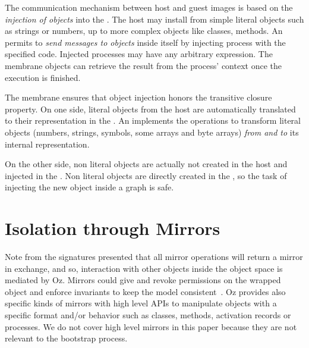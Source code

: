 The communication mechanism between host and guest images is based on the \emph{injection of objects} into the \objectspace. The host may install from simple literal objects such as strings or numbers, up to more complex objects like classes, methods. An \objectspace permits to \emph{send messages to objects} inside itself by injecting process with the specified code. Injected processes may have any arbitrary expression. The membrane objects can retrieve the result from the process' context once the execution is finished.

The \objectspace membrane ensures that object injection honors the transitive closure property. On one side, literal objects from the host are automatically translated to their representation in the \objectspace. An \objectspace implements the operations to transform literal objects (numbers, strings, symbols, some arrays and byte arrays) \emph{from and to} its internal representation.

On the other side, non literal objects are actually not created in the host and injected in the \objectspace. Non literal objects are directly created in the \objectspace, so the task of injecting the new object inside a graph is safe.


\section{Isolation through Mirrors} \label{sec:isolation}



Note from the signatures presented that all mirror operations will return a mirror in exchange, and so, interaction with other objects inside the object space is mediated by Oz. Mirrors could give and revoke permissions on the wrapped object and enforce invariants to keep the model consistent~\cite{Teru13a}.
Oz provides also specific kinds of mirrors with high level APIs to manipulate objects with a specific format and/or behavior such as classes, methods, activation records or processes. We do not cover high level mirrors in this paper because they are not relevant to the bootstrap process.


